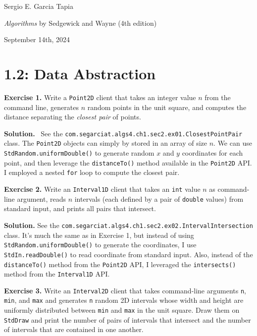 \documentclass[12pt, a4paper]{article}
\newenvironment{ex}[2][Exercise]
{\par\medskip\noindent \textbf{#1 #2.}}
{\medskip}
\newenvironment{sol}[1][Solution]
{\par\medskip\noindent \textbf{#1.} }
{\medskip}
\begin{document}
	\noindent Sergio E. Garcia Tapia \hfill
	
	\noindent \emph{Algorithms} by Sedgewick and Wayne (4th edition) \cite{sedgewick_wayne}\hfill
	
	\noindent September 14th, 2024\hfill 
	\section*{1.2: Data Abstraction}
	\begin{ex}{1}
		Write a \texttt{Point2D} client that takes an integer value $n$ from the command line,
		generates $n$ random points in the unit square, and computes the distance separating the
		\emph{closest pair} of points.
	\end{ex}
	\begin{sol}
		\
		See the \texttt{com.segarciat.algs4.ch1.sec2.ex01.ClosestPointPair} class.
		The \texttt{Point2D} objects can simply by stored in an array of size $n$.
		We can use \texttt{StdRandom.uniformDouble()} to generate random $x$ and $y$ coordinates
		for each point, and then leverage the \texttt{distanceTo()} method available in the
		\texttt{Point2D} API. I employed a nested \texttt{for} loop to compute the closest pair.
	\end{sol}
	\begin{ex}{2}
		Write an \texttt{Interval1D} client that takes an \texttt{int} value $n$ as command-line
		argument, reads $n$ intervals (each defined by a pair of \texttt{double} values)
		from standard input, and prints all pairs that intersect.
	\end{ex}
	\begin{sol}
		See the \texttt{com.segarciat.algs4.ch1.sec2.ex02.IntervalIntersection} class.
		It's much the same as in Exercise 1, but instead of using \texttt{StdRandom.uniformDouble()}
		to generate the coordinates, I use \texttt{StdIn.readDouble()} to read coordinate from
		standard input. Also, instead of the \texttt{distanceTo()} method from the
		\texttt{Point2D} API, I leveraged the \texttt{intersects()} method from the
		\texttt{Interval1D} API.
	\end{sol}
	\begin{ex}{3}
		Write an \texttt{Interval2D} client that takes command-line arguments \texttt{n},
		\texttt{min}, and \texttt{max} and generates \texttt{n} random 2D intervals whose
		width and height are uniformly distributed between \texttt{min} and \texttt{max}
		in the unit square. Draw them on \texttt{StdDraw} and print the number of pairs
		of intervals that intersect and the number of intervals that are contained in one
		another.
	\end{ex}
\end{document}
